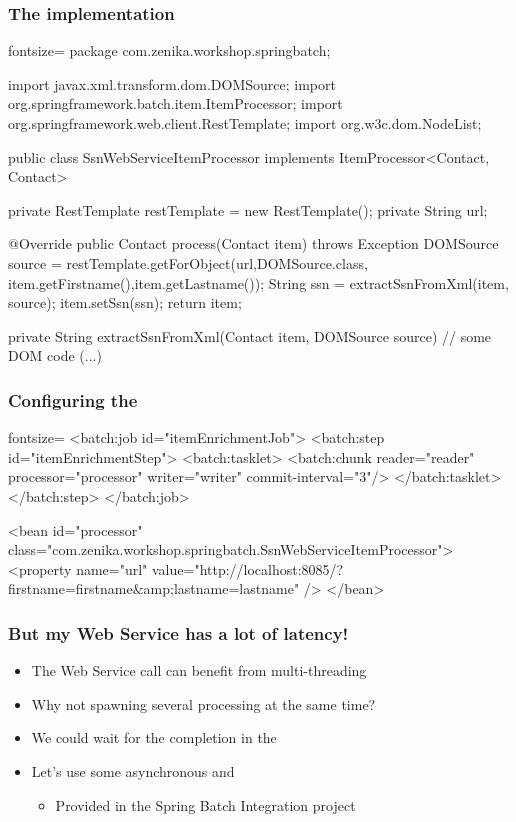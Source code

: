 \begin{frame}[fragile]
\frametitle{The  implementation}
\begin{javacode*}{fontsize=\tiny}
package com.zenika.workshop.springbatch;

import javax.xml.transform.dom.DOMSource;
import org.springframework.batch.item.ItemProcessor;
import org.springframework.web.client.RestTemplate;
import org.w3c.dom.NodeList;

public class SsnWebServiceItemProcessor implements
             ItemProcessor<Contact, Contact> {
	
  private RestTemplate restTemplate = new RestTemplate();
  private String url;

  @Override
  public Contact process(Contact item) throws Exception {
    DOMSource source = restTemplate.getForObject(url,DOMSource.class, 
      item.getFirstname(),item.getLastname());
    String ssn = extractSsnFromXml(item, source);
    item.setSsn(ssn);
    return item;
  }

  private String extractSsnFromXml(Contact item, DOMSource source) {
    // some DOM code
  }
  (...)
}
\end{javacode*}
\end{frame}

\begin{frame}[fragile]
\frametitle{Configuring the }
\begin{xmlcode*}{fontsize=\tiny}
<batch:job id="itemEnrichmentJob">
  <batch:step id="itemEnrichmentStep">
    <batch:tasklet>
      <batch:chunk reader="reader" processor="processor" writer="writer" 
                   commit-interval="3"/>
    </batch:tasklet>
  </batch:step>
</batch:job>

<bean id="processor" 
      class="com.zenika.workshop.springbatch.SsnWebServiceItemProcessor">
  <property name="url" 
  value="http://localhost:8085/?firstname={firstname}&amp;lastname={lastname}" />
</bean>
\end{xmlcode*}
\end{frame}

\begin{frame}
 \frametitle{But my Web Service has a lot of latency!}
 \begin{itemize}
  \item The Web Service call can benefit from multi-threading
  \item Why not spawning several processing at the same time?
  \item We could wait for the completion in the 
  \item Let's use some asynchronous  and 
  \begin{itemize}
    \item Provided in the Spring Batch Integration project
  \end{itemize}  
 \end{itemize}
\end{frame}

